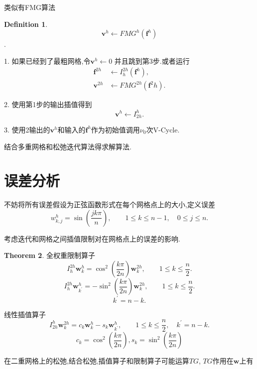\documentclass[a4paper]{book}
\numberwithin{equation}{chapter}
\theoremstyle{definition}
\newtheorem{thm}{Theorem}[chapter]
\newtheorem{defn}[thm]{Definition}
\begin{document}
类似有FMG算法

\begin{defn}
	\[\mathbf{v}^h \leftarrow FMG^h(\mathbf{f}^h)\].
	
	1. 如果已经到了最粗网格,令$\mathbf{v}^h \leftarrow 0$ 并且跳到第3步.或者运行
	\begin{align*}
	\mathbf{f}^{2h} &\leftarrow I_h^{2h} (\mathbf{f}^h),\\
	\mathbf{v}^{2h} &\leftarrow FMG^{2h}(\mathbf{f}^2h).
	\end{align*}
	
	2. 使用第1步的输出插值得到
	\[\mathbf{v}^h\leftarrow I_{2h}^h . \]
	
	3. 使用2输出的$\mathbf{v}^h$和输入的$\mathbf{f}^h$作为初始值调用$\nu_0$次V-Cycle.
\end{defn}


结合多重网格和松弛迭代算法得求解算法.


\section{误差分析}
不妨将所有误差假设为正弦函数形式在每个网格点上的大小,定义误差
\[w_{k,j}^h = \sin\left(\frac{jk \pi}{n}\right), \qquad 1 \leq k \leq n-1, \quad 0 \leq j \leq n.\]

考虑迭代和网格之间插值限制对在网格点上的误差的影响.

\begin{thm}
	全权重限制算子
	\[I_h^{2h} \mathbf{w}_k^h = \cos^2\left(\frac{k\pi}{2n}\right) \mathbf{w}_k^{2h}, \qquad 1 \leq k \leq \frac{n}{2}.\]
	\[I_h^{2h} \mathbf{w}_{k^{'}}^h = - \sin^2\left(\frac{k\pi}{2n}\right) \mathbf{w}_k^{2h}, \qquad 1 \leq k \leq \frac{n}{2}.\]
	\[k^{'} = n - k.\]
	
	线性插值算子
	\[I_{2h}^h \mathbf{w}_k^{2h} = c_k \mathbf{w}_k^h - s_k \mathbf{w}_{k^{'}}^h, 
	\qquad 1 \leq k \le \frac{n}{2}, \quad k^{'} = n - k.\]
	\[c_k = \cos^2\left(\frac{k\pi}{2n}\right), s_k = \sin^2\left(\frac{k\pi}{2n}\right)\]
	
\end{thm}

在二重网格上的松弛,结合松弛,插值算子和限制算子可能运算$TG$, $TG$作用在$\mathbf{w}$上有
\end{document}
